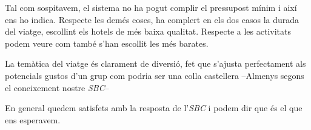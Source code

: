 \documentclass[11pt,a4paper]{article}
\begin{document}
Tal com sospitavem, el sistema no ha pogut complir el pressupost mínim i així ens ho indica. Respecte les demés coses, ha complert en els dos casos la durada del viatge, escollint els hotels de més baixa qualitat. Respecte a les activitats podem veure com també s'han escollit les més barates. 

La temàtica del viatge és clarament de diversió, fet que s'ajusta perfectament als potencials gustos d'un grup com podria ser una colla castellera --Almenys segons el coneixement nostre \emph{SBC}--

En general quedem satisfets amb la resposta de l'\emph{SBC} i podem dir que és el que ens esperavem.
\end{document}
